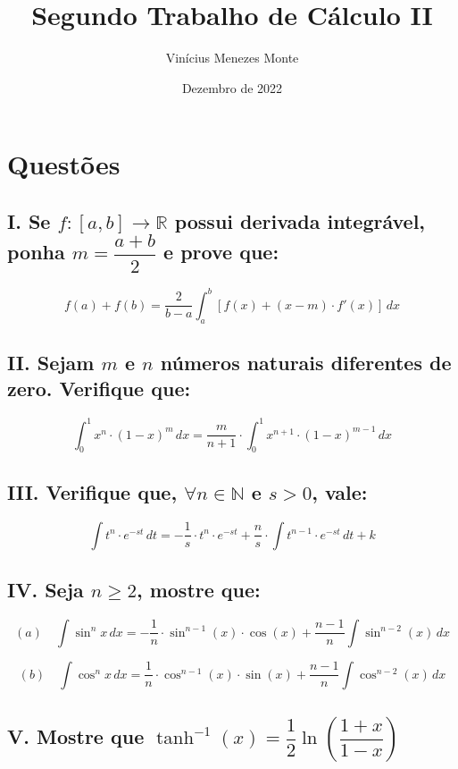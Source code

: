 \documentclass{article}
\title{Segundo Trabalho de Cálculo II}
\author{Vinícius Menezes Monte}
\date{Dezembro de 2022}
\begin{document}
\maketitle

\section*{Questões}

\subsection*{
I. Se \(f:[a,b]\longrightarrow \mathbb{R} \) possui derivada integrável,
ponha \(m = \dfrac{a+b}{2}\) e prove que:
}
\[
    f(a) + f(b) =
    \dfrac{2}{b-a} \int_a^b [f(x) + (x-m) \cdot f'(x)] \, dx
\]

\subsection*{II. Sejam \(m\) e \(n\) números naturais diferentes de zero. Verifique que:}
\[
    \int_0^1 x^n \cdot (1-x)^m \, dx =
    \dfrac{m}{n+1} \cdot \int_0^1 x^{n+1} \cdot (1-x)^{m-1} \, dx
\]

\subsection*{III. Verifique que, \( \forall n \in \mathbb{N}\) e \(s > 0\), vale:}
\[
    \int t^n \cdot e^{-st} \, dt
    =
    -\dfrac{1}{s} \cdot t^n \cdot e^{-st}
    + \dfrac{n}{s} \cdot \int t^{n-1} \cdot e^{-st} \, dt
    + k
\]

\subsection*{IV. Seja \(n \ge 2\), mostre que:}

\[
    (a) \quad \int \sin^nx \, dx
    = -\dfrac{1}{n} \cdot \sin^{n-1}(x) \cdot \cos(x)
    + \dfrac{n-1}{n} \int \sin^{n-2}(x) \, dx
\]

\[
    (b) \quad \int \cos^nx \, dx
    = \dfrac{1}{n} \cdot \cos^{n-1}(x) \cdot \sin(x)
    + \dfrac{n-1}{n} \int \cos^{n-2}(x) \, dx
\]

\subsection*{V. Mostre que \(\tanh^{-1}(x) = \dfrac{1}{2}\ln\left(\dfrac{1+x}{1-x} \right) \)}

\pagebreak
\end{document}

